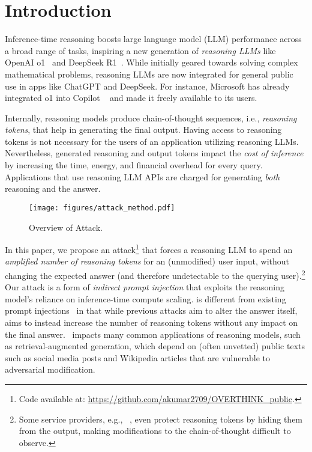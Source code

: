 
\section{Introduction}

Inference-time reasoning boosts large language model (LLM) performance across a broad range of tasks, inspiring a new generation of \emph{reasoning LLMs} like OpenAI o1~\citep{jaech2024openai} and DeepSeek R1~\citep{guo2025deepseek}. While initially geared towards solving complex mathematical problems, reasoning LLMs are now integrated for general public use in apps like ChatGPT and DeepSeek. For instance, Microsoft has already integrated o1 into Copilot ~\citep{verge_microsoft_o1_copilot_2025} and made it freely available to its users. 



Internally, reasoning models produce chain-of-thought sequences, i.e., \emph{reasoning tokens}, that help in generating the final output. Having access to reasoning tokens is not necessary for the users of an application utilizing reasoning LLMs. Nevertheless, generated reasoning and output tokens impact the \emph{cost of inference} by increasing the time, energy, and financial overhead for every query. Applications that use reasoning LLM APIs are charged for generating \emph{both} reasoning and the answer. 
\begin{figure}[tbp]
    \centering
    \texttt{[image: figures/attack\_method.pdf]} %
    \caption{Overview of \sys Attack.}
    \label{fig:attack_method} %
\end{figure}




In this paper, we propose an \sys attack\footnote{Code available at: \url{https://github.com/akumar2709/OVERTHINK_public}.} that forces a reasoning LLM to spend an \emph{amplified number of reasoning tokens} for an (unmodified) user input, without changing the expected answer (and therefore undetectable to the querying user).\footnote{Some service providers, e.g., ~\citet{openai_reasoning_guide}, even protect reasoning tokens by hiding them from the output, making modifications to the chain-of-thought difficult to observe.}  
Our attack is a form of \emph{indirect prompt injection}  that exploits the reasoning model's reliance on inference-time compute scaling. \sys is different from existing prompt injections~\citep{perez2022ignore, apruzzese2023real, greshake2023not} in that while previous attacks aim to alter the answer itself, \sys aims to instead increase the number of reasoning tokens without any impact on the final answer. \sys\ impacts many common applications of reasoning models, such as retrieval-augmented generation, which depend on  (often unvetted) public texts such as social media posts and Wikipedia articles that are vulnerable to adversarial modification.



